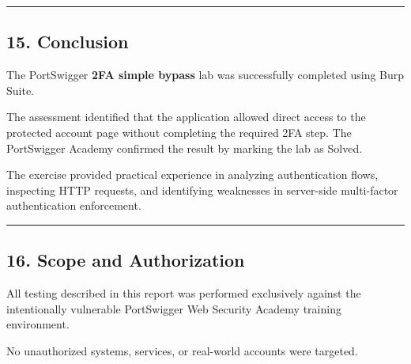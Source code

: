 \documentclass[
]{article}
\begin{document}
\begin{center}\rule{0.5\linewidth}{0.5pt}\end{center}

\subsection{15. Conclusion}\label{conclusion}

The PortSwigger \textbf{2FA simple bypass} lab was successfully
completed using Burp Suite.

The assessment identified that the application allowed direct access to
the protected account page without completing the required 2FA step. The
PortSwigger Academy confirmed the result by marking the lab as Solved.

The exercise provided practical experience in analyzing authentication
flows, inspecting HTTP requests, and identifying weaknesses in
server-side multi-factor authentication enforcement.

\begin{center}\rule{0.5\linewidth}{0.5pt}\end{center}

\subsection{16. Scope and Authorization}\label{scope-and-authorization}

All testing described in this report was performed exclusively against
the intentionally vulnerable PortSwigger Web Security Academy training
environment.

No unauthorized systems, services, or real-world accounts were targeted.
\end{document}
